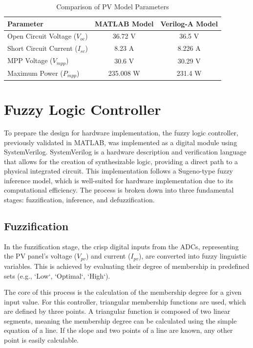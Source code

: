 \documentclass[a4paper,oneside,12pt]{report}
\numberwithin{equation}{chapter}
\begin{document}
\begin{table}[H]
    \centering
    \caption{Comparison of PV Model Parameters}
    \begin{tabular}{|l|c|c|}
        \hline
        \textbf{Parameter} & \textbf{MATLAB Model} & \textbf{Verilog-A Model} \\
        \hline
        Open Circuit Voltage ($V_{oc}$) & 36.72 V & 36.5 V \\
        \hline
        Short Circuit Current ($I_{sc}$) & 8.23 A & 8.226 A \\
        \hline
        MPP Voltage ($V_{mpp}$) & 30.6 V & 30.29 V \\
        \hline
        Maximum Power ($P_{mpp}$) & 235.008 W & 231.4 W \\
        \hline
    \end{tabular}
    \label{tab:pv_model_comparison}
\end{table}

\section{Fuzzy Logic Controller}
\label{sec:sv_fuzzy_engine}
To prepare the design for hardware implementation, the fuzzy logic controller, previously validated in MATLAB, was implemented as a digital module using SystemVerilog. SystemVerilog is a hardware description and verification language that allows for the creation of synthesizable logic, providing a direct path to a physical integrated circuit. This implementation follows a Sugeno-type fuzzy inference model, which is well-suited for hardware implementation due to its computational efficiency. The process is broken down into three fundamental stages: fuzzification, inference, and defuzzification.

\subsection{Fuzzification}
\label{sec:sv_fuzzification}
In the fuzzification stage, the crisp digital inputs from the ADCs, representing the PV panel's voltage ($V_{pv}$) and current ($I_{pv}$), are converted into fuzzy linguistic variables. This is achieved by evaluating their degree of membership in predefined sets (e.g., `Low`, `Optimal`, `High`).

The core of this process is the calculation of the membership degree for a given input value. For this controller, triangular membership functions are used, which are defined by three points. A triangular function is composed of two linear segments, meaning the membership degree can be calculated using the simple equation of a line. If the slope and two points of a line are known, any other point is easily calculable.
\end{document}

